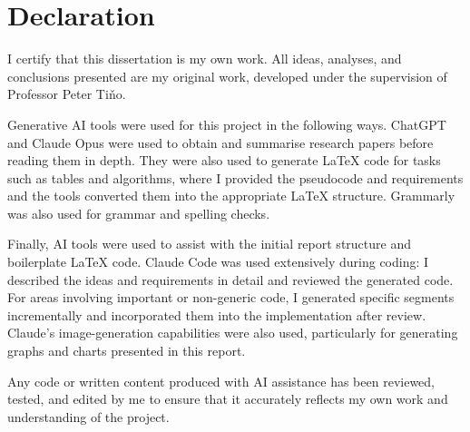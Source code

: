 
\chapter*{Declaration}

I certify that this dissertation is my own work. All ideas, analyses, and conclusions presented are my original work, developed under the supervision of Professor Peter Ti{\v{n}}o.

Generative AI tools were used for this project in the following ways. ChatGPT and Claude Opus were used to obtain and summarise research papers before reading them in depth. They were also used to generate LaTeX code for tasks such as tables and algorithms, where I provided the pseudocode and requirements and the tools converted them into the appropriate LaTeX structure. Grammarly was also used for grammar and spelling checks.

Finally, AI tools were used to assist with the initial report structure and boilerplate LaTeX code. Claude Code was used extensively during coding: I described the ideas and requirements in detail and reviewed the generated code. For areas involving important or non-generic code, I generated specific segments incrementally and incorporated them into the implementation after review. Claude's image-generation capabilities were also used, particularly for generating graphs and charts presented in this report.

Any code or written content produced with AI assistance has been reviewed, tested, and edited by me to ensure that it accurately reflects my own work and understanding of the project.
